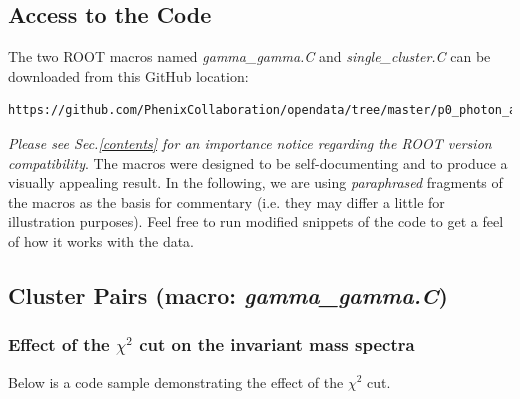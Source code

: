 \documentclass[pdftex,12pt,letter]{article}
\begin{document}
\subsection{Access to the Code}
The two ROOT macros named \textit{gamma\_gamma.C} and
\textit{single\_cluster.C} can be downloaded from this GitHub location:
\begin{verbatim}
https://github.com/PhenixCollaboration/opendata/tree/master/p0_photon_analysis
\end{verbatim}
\textit{Please see Sec.\ref{contents} for an importance notice regarding the ROOT
version compatibility}.
The macros were designed to be self-documenting and to produce a visually appealing
result.
In the following, we are using {\it paraphrased} fragments of the macros as the basis
for commentary (i.e. they may differ a little for illustration purposes). Feel free to
run modified snippets of the code to get a feel of how it works with the data.

\subsection{Cluster Pairs (macro: \textit{gamma\_gamma.C})}
\subsubsection{Effect of the $\chi^2$ cut on the invariant mass spectra}
Below is a code sample demonstrating the effect of the $\chi^2$ cut.
\end{document}

